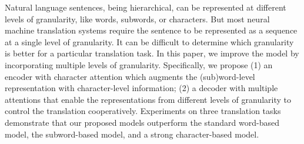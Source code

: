 Natural language sentences, being hierarchical, can be represented at different levels of granularity, like words, subwords, or characters. But most neural machine translation systems require the sentence to be represented as a sequence at a single level of granularity. It can be difficult to determine which granularity is better for a particular translation task. In this paper, we improve the model by incorporating multiple levels of granularity. Specifically, we propose (1) an encoder with character attention which augments the (sub)word-level representation with character-level information; (2) a decoder with multiple attentions that enable the representations from different levels of granularity to control the translation cooperatively. Experiments on three translation tasks demonstrate that our proposed models outperform the standard word-based model, the subword-based model, and a strong character-based model.

